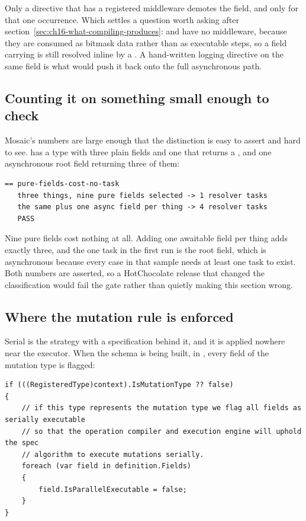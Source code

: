 Only a directive that has a registered middleware demotes the field, and only
for that one occurrence. Which settles a question worth asking after
section~\ref{sec:ch16-what-compiling-produces}:  and 
have no middleware, because they are consumed as bitmask data rather than as
executable steps, so a field carrying  is still resolved inline by a
. A hand-written logging directive on the same field is
what would push it back onto the full asynchronous path.

\subsection*{Counting it on something small enough to check}

%
Mosaic's numbers are large enough that the distinction is easy to assert and
hard to see.  has a type with three plain
fields and one that returns a , and one asynchronous root
field returning three of them:

\begin{verbatim}
== pure-fields-cost-no-task
   three things, nine pure fields selected -> 1 resolver tasks
   the same plus one async field per thing -> 4 resolver tasks
   PASS
\end{verbatim}

Nine pure fields cost nothing at all. Adding one awaitable field per thing adds
exactly three, and the one task in the first run is the root field, which is
asynchronous because every case in that sample needs at least one task to exist.
Both numbers are asserted, so a HotChocolate release that changed the
classification would fail the gate rather than quietly making this section
wrong.

\subsection*{Where the mutation rule is enforced}

%
Serial is the strategy with a specification behind it, and it is applied
nowhere near the executor. When the schema is being built, in
, every field of the mutation type is
flagged:

\begin{verbatim}
if (((RegisteredType)context).IsMutationType ?? false)
{
    // if this type represents the mutation type we flag all fields as serially executable
    // so that the operation compiler and execution engine will uphold the spec
    // algorithm to execute mutations serially.
    foreach (var field in definition.Fields)
    {
        field.IsParallelExecutable = false;
    }
}
\end{verbatim}

